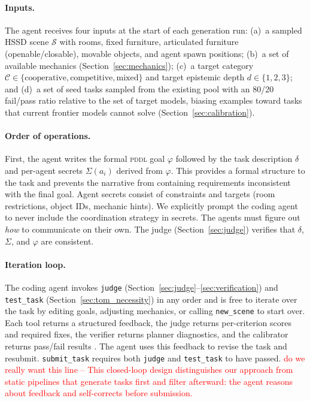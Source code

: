 \documentclass{article} %
\newcommand{\goal}{\varphi}
\newcommand{\taskdesc}{\delta}
\newcommand{\pddl}{\textsc{pddl}}
\newcommand{\g}[1]{\textcolor{red}{#1}}
\begin{document}
\paragraph{Inputs.} The agent receives four inputs at the start of each generation run: (a)~a sampled HSSD scene $\mathcal{S}$ with rooms, fixed furniture,  articulated furniture (openable/closable), movable objects, and agent spawn positions; (b)~a set of available mechanics (Section~\ref{sec:mechanics}); (c)~a target category $\mathcal{C} \in \{\text{cooperative}, \text{competitive}, \text{mixed}\}$ and target epistemic depth $d \in \{1,2,3\}$; and (d)~a set of seed tasks sampled from the existing pool with an 80/20 fail/pass ratio relative to the set of target models, biasing examples toward tasks that current frontier models cannot solve (Section~\ref{sec:calibration}).

\paragraph{Order of operations.} First, the agent writes the formal \pddl{} goal $\goal$ followed by the task description $\taskdesc$ and per-agent secrets $\Sigma(a_i)$ derived from $\goal$. This provides a formal structure to the task and prevents the narrative from containing requirements inconsistent with the final goal. Agent secrets consist of constraints and targets (room restrictions, object IDs, mechanic hints). We explicitly prompt the coding agent to never include the coordination strategy in secrets. The agents must figure out \emph{how} to communicate on their own. The judge (Section~\ref{sec:judge}) verifies that $\taskdesc$, $\Sigma$, and $\goal$ are consistent.

\paragraph{Iteration loop.} The coding agent invokes \texttt{judge} (Section~\ref{sec:judge}--\ref{sec:verification}) and \texttt{test\_task} (Section~\ref{sec:tom_necessity}) in any order and is free to iterate over the task by editing goals, adjusting mechanics, or calling \texttt{new\_scene} to start over. Each tool returns a structured feedback, the judge returns per-criterion scores and required fixes, the verifier returns planner diagnostics, and the calibrator returns pass/fail results . The agent uses this feedback to revise the task and resubmit. \texttt{submit\_task} requires both \texttt{judge} and \texttt{test\_task} to have passed. \g{ do we really want this line -- This closed-loop design distinguishes our approach from static pipelines that generate tasks first and filter afterward: the agent reasons about feedback and self-corrects before submission.}
\end{document}
